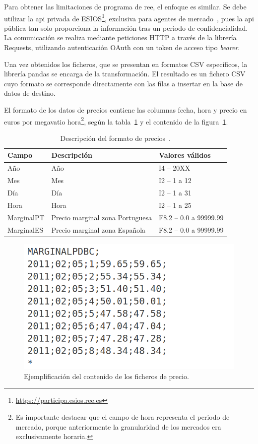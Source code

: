 Para obtener las limitaciones de programa de \gls{ree}, el enfoque es similar. Se debe utilizar la \gls{api} privada de ESIOS\footnote{\url{https://participa.esios.ree.es}}, exclusiva para agentes de mercado~\cite{red2025esios}, pues la \gls{api} pública tan solo proporciona la información tras un periodo de confidencialidad. La comunicación se realiza mediante peticiones HTTP a través de la librería Requests, utilizando autenticación OAuth con un token de acceso tipo \textit{bearer}.

Una vez obtenidos los ficheros, que se presentan en formatos CSV específicos, la librería pandas se encarga de la transformación. El resultado es un fichero CSV cuyo formato se corresponde directamente con las filas a insertar en la base de datos de destino.

El formato de los datos de precios contiene las columnas fecha, hora y precio en euros por megavatio hora\footnote{Es importante destacar que el campo de hora representa el periodo de mercado, porque anteriormente la granularidad de los mercados era exclusivamente horaria.}, según la tabla~\ref{tab:descripción-precio} y el contenido de la figura~\ref{fig:contenido-precio}.

\begin{table}[ht]
  \centering
  \begin{tabular}{|l|p{7.5cm}|l|}
    \hline
    Campo      & Descripción                     & Valores válidos        \\
    \hline
    Año        & Año                             & I4 -- 20XX             \\
    Mes        & Mes                             & I2 -- 1 a 12           \\
    Día        & Día                             & I2 -- 1 a 31           \\
    Hora       & Hora                            & I2 -- 1 a 25           \\
    MarginalPT & Precio marginal zona Portuguesa & F8.2 -- 0.0 a 99999.99 \\
    MarginalES & Precio marginal zona Española   & F8.2 -- 0.0 a 99999.99 \\
    \hline
  \end{tabular}
  \caption[Descripción del formato de precios.]{Descripción del formato de precios~\cite{omie2025modelo}.}
  \label{tab:descripción-precio}
\end{table}

\begin{figure}
  \centering
  \includegraphics[width=0.5\linewidth]{figures/contenido-precio.png}
  \caption[Ejemplificación del contenido de los ficheros de precio.]{Ejemplificación del contenido de los ficheros de precio.}
  \label{fig:contenido-precio}
\end{figure}

